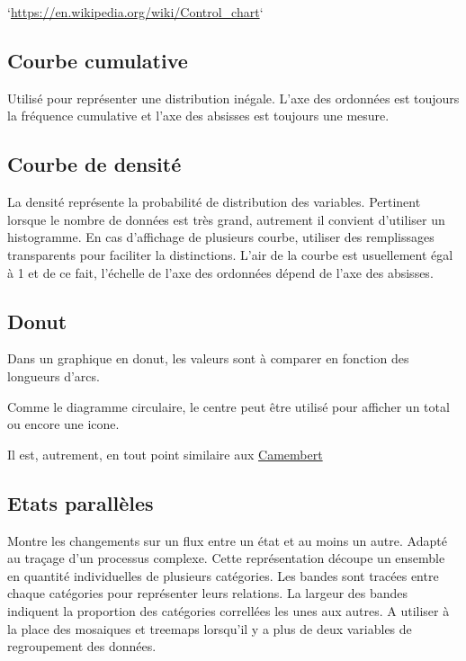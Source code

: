\documentclass[a4paper,12pt]{article}
\begin{document}
\begin{multicols}{2}
`\url{https://en.wikipedia.org/wiki/Control\_chart}`
\subsection*{Courbe cumulative}
\label{sec:org93f5bb6}
Utilisé pour représenter une distribution inégale. L'axe des ordonnées est toujours la fréquence cumulative et l'axe des absisses est toujours une mesure. \autocite{alansmithLexiqueVisuel}
\subsection*{Courbe de densité}
\label{sec:org5d62106}
La densité représente la probabilité de distribution des variables. \autocite{sosulskiGraphics2019} Pertinent lorsque le nombre de données est très grand, autrement il convient d'utiliser un histogramme. \autocite{wilkeVisualizingManyDistributions2019} En cas d'affichage de plusieurs courbe, utiliser  des remplissages transparents pour faciliter la distinctions. L'air de la courbe est usuellement égal à 1 et de ce fait, l'échelle de l'axe des ordonnées dépend de l'axe des absisses. \autocite{wilkeVisualizingManyDistributions2019}
\subsection*{Donut}
\label{sec:org483e3d7}
Dans un graphique en donut, les valeurs sont à comparer en fonction des longueurs d'arcs.

Comme le diagramme circulaire, le centre peut être utilisé pour afficher un total ou encore une icone. \autocite{alansmithLexiqueVisuel}

Il est, autrement, en tout point similaire aux \hyperref[sec:orgb31f527]{Camembert}
\subsection*{Etats parallèles}
\label{sec:org18f9e30}
Montre les changements sur un flux entre un état et au moins un autre. Adapté au traçage d'un processus complexe. \autocite{alansmithLexiqueVisuel}
Cette représentation découpe un ensemble en quantité individuelles de plusieurs catégories. Les bandes sont tracées entre chaque catégories pour représenter leurs relations. La largeur des bandes indiquent la proportion des catégories correllées les unes aux autres. \autocite{wilkeVisualizingNestedProportions2019}
A utiliser à la place des mosaiques et treemaps lorsqu'il y a plus de deux variables de regroupement des données. \autocite{wilkeDirectoryVisualizations2019}

\end{multicols}
\end{document}
